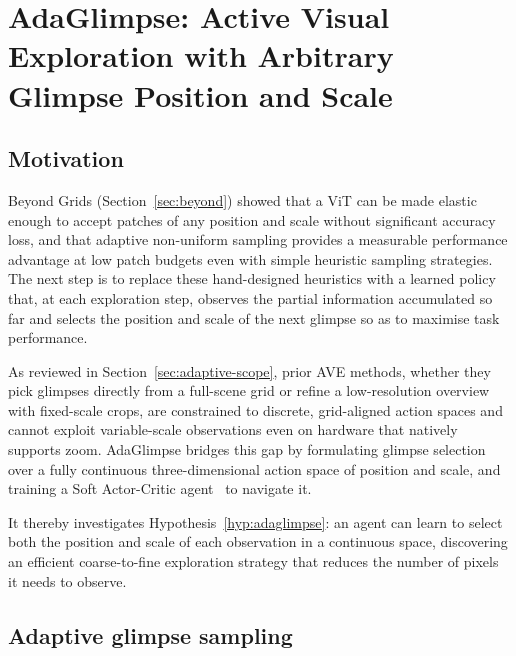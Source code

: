 \section{AdaGlimpse: Active Visual Exploration with Arbitrary Glimpse Position and Scale}
\label{sec:adaglimpse}

\subsection{Motivation}
\label{sec:motivation-adaglimpse}

Beyond Grids (Section~\ref{sec:beyond}) showed that a ViT can be made elastic enough to accept patches of any position and scale without significant accuracy loss, and that adaptive non-uniform sampling provides a measurable performance advantage at low patch budgets even with simple heuristic sampling strategies. The next step is to replace these hand-designed heuristics with a learned policy that, at each exploration step, observes the partial information accumulated so far and selects the position and scale of the next glimpse so as to maximise task performance.

As reviewed in Section~\ref{sec:adaptive-scope}, prior AVE methods, whether they pick glimpses directly from a full-scene grid or refine a low-resolution overview with fixed-scale crops, are constrained to discrete, grid-aligned action spaces and cannot exploit variable-scale observations even on hardware that natively supports zoom. AdaGlimpse bridges this gap by formulating glimpse selection over a fully continuous three-dimensional action space of position and scale, and training a Soft Actor-Critic agent~\cite{haarnoja2018soft} to navigate it.

It thereby investigates Hypothesis~\ref{hyp:adaglimpse}: an agent can learn to select both the position and scale of each observation in a continuous space, discovering an efficient coarse-to-fine exploration strategy that reduces the number of pixels it needs to observe.

\subsection{Adaptive glimpse sampling}
\label{sec:adaglimpse-formulation}

